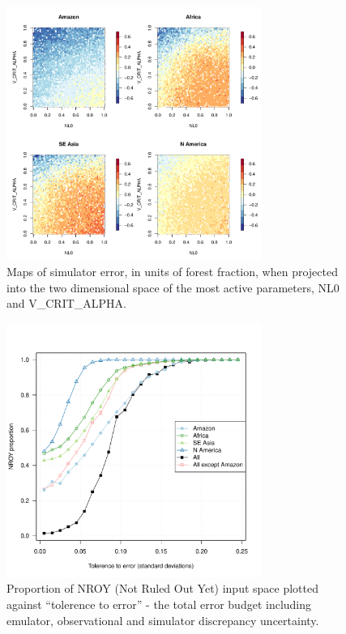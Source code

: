 \documentclass[esd, article]{copernicus} %
\begin{document}
\begin{figure}[t]
\includegraphics[width=8.3cm]{graphics/discrepancy_parameter_space.pdf}
\caption{Maps of simulator error, in units of forest fraction, when projected into the two dimensional space of the most active parameters, NL0 and V\_CRIT\_ALPHA.}
\label{fig:discrepancy_parameter_space}
\end{figure}

\begin{figure}[t]
\includegraphics[width=8.3cm]{graphics/Prop_NROY_tolerance_unc.pdf}
\caption{Proportion of NROY (Not Ruled Out Yet) input space plotted against ``tolerence to error'' - the total error budget including emulator, observational and simulator discrepancy uncertainty.}
\label{fig:Prop_NROY_tolerance_unc}
\end{figure}

\end{document}
